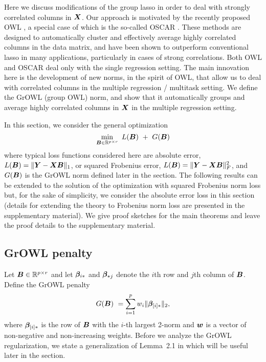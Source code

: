 
Here we discuss modifications of the group lasso in order to deal with strongly correlated columns in $\boldsymbol{X}$.  Our approach is motivated by the recently proposed OWL \cite{owl}, a special case of which is the so-called OSCAR \cite{oscar}.  These methods are designed to automatically cluster and effectively average highly correlated columns in the data matrix, and have been shown to outperform conventional lasso in many applications, particularly in cases of strong correlations. Both OWL and OSCAR deal only with the single regression setting. The main innovation here is the development of new norms, in the spirit of OWL, that allow us to deal with correlated columns in the multiple regression / multitask setting. We define the GrOWL (group OWL) norm, and show that it automatically groups and average highly correlated columns in $\boldsymbol{X}$ in the multiple regression setting. 

In this section, we consider the general optimization
\begin{equation}\label{eqn:L1}
\min_{\bB \in \R^{p \times r}} \ L(\bB) \ + \ G(\bB)   
\end{equation}
 where typical loss functions considered here are absolute error, $L(\boldsymbol{B}) = \|\boldsymbol{Y} - \boldsymbol{X} \boldsymbol{B} \|_1$, or squared Frobenius error, $L(\boldsymbol{B}) = \|\boldsymbol{Y} - \boldsymbol{X} \boldsymbol{B} \|_F^2$, and $G(\boldsymbol{B})$ is the GrOWL norm defined later in the section. The following results can be extended to the solution of the optimization with squared Frobenius norm loss but, for the sake of simplicity, we consider the absolute error loss in this section (details for extending the theory to Frobenius norm loss are presented in the supplementary material). We give proof sketches for the main theorems and leave the proof details to the supplementary material.  

\subsection{GrOWL penalty}
Let $\boldsymbol{B} \in {\mathbb R}^{p\times r}$ and let $\boldsymbol{\beta}_{i {\ast}}$ and $\boldsymbol{\beta}_{{\ast}  j}$ denote the $i$th row and $j$th column of $\boldsymbol{B}$.  Define the GrOWL penalty
\begin{equation}\label{Eqn:growl}
G(\bB) \ =  \sum_{i=1}^p w_i \|\bbeta_{[i]\a}\|_2 , 
\end{equation}
where $\boldsymbol{\beta}_{[i]{\ast}}$ is the row of $\boldsymbol{B}$ with the $i$-th largest 2-norm and $\boldsymbol{w}$ is a vector of non-negative and non-increasing weights.
Before we analyze the GrOWL regularization, we state a generalization of Lemma~2.1 in \cite{owl} which will be useful later in the section. 

